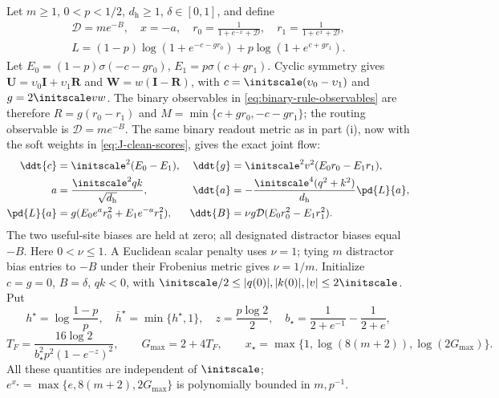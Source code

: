 Let $m\ge1$, $0<p<1/2$, $d_{\mathrm h}\ge1$, $\delta\in[0,1]$, and define
\[
 \begin{gathered}
 \mathcal D=me^{-B},\quad x=-a,\quad
 r_0=\frac1{1+e^{-x}+\mathcal D},\quad r_1=\frac1{1+e^x+\mathcal D},\\
 L=(1-p)\log(1+e^{-c-gr_0})+p\log(1+e^{c+gr_1}).
 \end{gathered}
\]
Let $E_0=(1-p)\sigma(-c-gr_0)$, $E_1=p\sigma(c+gr_1)$.
Cyclic symmetry gives $\mathbf U=\upsilon_0\mathbf I+\upsilon_1\mathbf R$ and $\mathbf W=w(\mathbf I-\mathbf R)$, with
$c=\initscale(\upsilon_0-\upsilon_1)$ and $g=2\initscale vw$. The binary observables in \cref{eq:binary-rule-observables} are therefore $R=g(r_0-r_1)$ and $M=\min\{c+gr_0,-c-gr_1\}$; the routing observable is $\mathcal D=me^{-B}$.
The same binary readout metric as in part (i), now with the soft weights in \cref{eq:J-clean-scores}, gives the exact joint flow:
\begin{align*}
 \ddt{c}&=\initscale^2(E_0-E_1),&
 \ddt{g}&=\initscale^2v^2(E_0r_0-E_1r_1),\\
 a&=\frac{\initscale^2qk}{\sqrt{d_{\mathrm h}}},&
 \ddt{a}&=-\frac{\initscale^4(q^2+k^2)}{d_{\mathrm h}}\pd{L}{a},\\
 \pd{L}{a}&=g(E_0e^a r_0^2+E_1e^{-a}r_1^2),&
 \ddt{B}&=\nu g\mathcal D(E_0r_0^2-E_1r_1^2).
\end{align*}
The two useful-site biases are held at zero; all designated distractor biases equal $-B$.
Here $0<\nu\le1$. A Euclidean scalar penalty uses $\nu=1$; tying $m$ distractor bias entries to $-B$ under their Frobenius metric gives $\nu=1/m$.
Initialize $c=g=0$, $B=\delta$, $qk<0$, with
$\initscale/2\le |q(0)|,|k(0)|,|v|\le2\initscale$.
Put
\begin{equation}
 h^\star=\log\frac{1-p}{p},\quad \bar h^\star=\min\{h^\star,1\},\quad
 z=\frac{p\log2}{2},\quad
 b_\star=\frac1{2+e^{-1}}-\frac1{2+e},
\end{equation}
\begin{equation}
 T_F=\frac{16\log2}{b_\star^2p^2(1-e^{-z})^2},\qquad
 G_{\max}=2+4T_F,\qquad x_\star=\max\{1,\log(8(m+2)),\log(2G_{\max})\}.
 \label{eq:CR-constants}
\end{equation}
All these quantities are independent of $\initscale$; $e^{x_\star}=\max\{e,8(m+2),2G_{\max}\}$ is polynomially bounded in $m,p^{-1}$.

